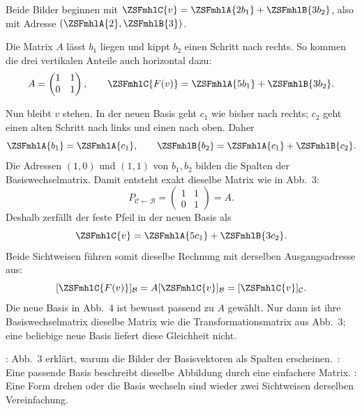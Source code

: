\begin{defbox}
 Beide Bilder beginnen mit $\ZSFmhlC{v}=\ZSFmhlA{2b_1}+\ZSFmhlB{3b_2}$, also mit Adresse $(\ZSFmhlA{2},\ZSFmhlB{3})$.

 Die Matrix $A$ lässt $b_1$ liegen und kippt $b_2$ einen Schritt nach rechts. So kommen die drei vertikalen Anteile auch horizontal dazu:
\[
  A=\begin{pmatrix}1&1\\0&1\end{pmatrix},\qquad
  \ZSFmhlC{F(v)}=\ZSFmhlA{5b_1}+\ZSFmhlB{3b_2}.
\]

 Nun bleibt $v$ stehen. In der neuen Basis geht $c_1$ wie bisher nach rechts; $c_2$ geht einen alten Schritt nach links und einen nach oben. Daher
\[
  \ZSFmhlA{b_1}=\ZSFmhlA{c_1},\qquad
  \ZSFmhlB{b_2}=\ZSFmhlA{c_1}+\ZSFmhlB{c_2}.
\]
Die Adressen $(1,0)$ und $(1,1)$ von $b_1,b_2$ bilden die Spalten der Basiswechselmatrix. Damit entsteht exakt dieselbe Matrix wie in Abb.~3:
\[
  P_{\mathcal C\leftarrow\mathcal B}
  =\begin{pmatrix}1&1\\0&1\end{pmatrix}
  =A.
\]
Deshalb zerfällt der feste Pfeil in der neuen Basis als
\[
  \ZSFmhlC{v}=\ZSFmhlA{5c_1}+\ZSFmhlB{3c_2}.
\]
Beide Sichtweisen führen somit dieselbe Rechnung mit derselben Ausgangsadresse aus:
\[
  [\ZSFmhlC{F(v)}]_{\mathcal B}
  =A[\ZSFmhlC{v}]_{\mathcal B}
  =[\ZSFmhlC{v}]_{\mathcal C}.
\]
Die neue Basis in Abb.~4 ist bewusst passend zu $A$ gewählt. Nur dann ist ihre Basiswechselmatrix dieselbe Matrix wie die Transformationsmatrix aus Abb.~3; eine beliebige neue Basis liefert diese Gleichheit nicht.
\end{defbox}

\begin{defbox}
 : Abb.~3 erklärt, warum die Bilder der Basisvektoren als Spalten erscheinen.
 \,: Eine passende Basis beschreibt dieselbe Abbildung durch eine einfachere Matrix.
 : Eine Form drehen oder die Basis wechseln sind wieder zwei Sichtweisen derselben Vereinfachung.
\end{defbox}
